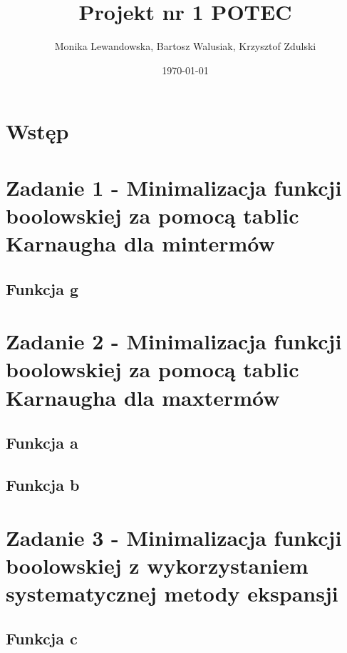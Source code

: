 \documentclass[a4paper, 12pt]{article}
\begin{document}
    \title{Projekt nr 1 POTEC}
    \author{Monika Lewandowska, Bartosz Walusiak, Krzysztof Zdulski}
    \date{\today}
    \maketitle

    \tableofcontents

    \newpage
    \section{Wstęp}\label{sec:intro}
    

    \newpage
    \section{Zadanie 1 - Minimalizacja funkcji boolowskiej za pomocą tablic Karnaugha dla mintermów}\label{sec:task-1}
    \subsection{Funkcja g}\label{subsec:fun-g}
    

    \newpage
    \section{Zadanie 2 - Minimalizacja funkcji boolowskiej za pomocą tablic Karnaugha dla maxtermów}\label{sec:task-2}
    \subsection{Funkcja a}\label{subsec:fun-a}
    

    \newpage
    \subsection{Funkcja b}\label{subsec:fun-b}
    

    \newpage
    \section{Zadanie 3 - Minimalizacja funkcji boolowskiej z wykorzystaniem systematycznej metody ekspansji}\label{sec:task-3}
    \subsection{Funkcja c}\label{subsec:fun-c}
    
\end{document}
